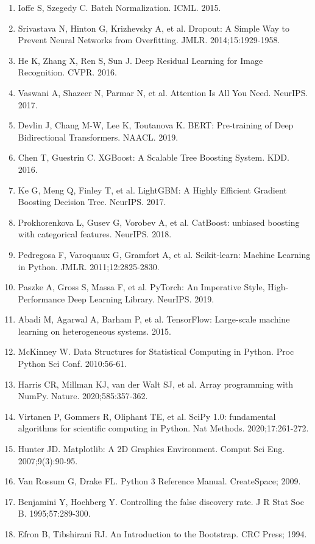 \documentclass[11pt]{article}
\begin{document}
\begin{enumerate}
\item Ioffe S, Szegedy C. Batch Normalization. ICML. 2015.
\item Srivastava N, Hinton G, Krizhevsky A, et al. Dropout: A Simple Way to Prevent Neural Networks from Overfitting. JMLR. 2014;15:1929-1958.
\item He K, Zhang X, Ren S, Sun J. Deep Residual Learning for Image Recognition. CVPR. 2016.
\item Vaswani A, Shazeer N, Parmar N, et al. Attention Is All You Need. NeurIPS. 2017.
\item Devlin J, Chang M-W, Lee K, Toutanova K. BERT: Pre-training of Deep Bidirectional Transformers. NAACL. 2019.
\item Chen T, Guestrin C. XGBoost: A Scalable Tree Boosting System. KDD. 2016.
\item Ke G, Meng Q, Finley T, et al. LightGBM: A Highly Efficient Gradient Boosting Decision Tree. NeurIPS. 2017.
\item Prokhorenkova L, Gusev G, Vorobev A, et al. CatBoost: unbiased boosting with categorical features. NeurIPS. 2018.
\item Pedregosa F, Varoquaux G, Gramfort A, et al. Scikit-learn: Machine Learning in Python. JMLR. 2011;12:2825-2830.
\item Paszke A, Gross S, Massa F, et al. PyTorch: An Imperative Style, High-Performance Deep Learning Library. NeurIPS. 2019.
\item Abadi M, Agarwal A, Barham P, et al. TensorFlow: Large-scale machine learning on heterogeneous systems. 2015.
\item McKinney W. Data Structures for Statistical Computing in Python. Proc Python Sci Conf. 2010:56-61.
\item Harris CR, Millman KJ, van der Walt SJ, et al. Array programming with NumPy. Nature. 2020;585:357-362.
\item Virtanen P, Gommers R, Oliphant TE, et al. SciPy 1.0: fundamental algorithms for scientific computing in Python. Nat Methods. 2020;17:261-272.
\item Hunter JD. Matplotlib: A 2D Graphics Environment. Comput Sci Eng. 2007;9(3):90-95.
\item Van Rossum G, Drake FL. Python 3 Reference Manual. CreateSpace; 2009.
\item Benjamini Y, Hochberg Y. Controlling the false discovery rate. J R Stat Soc B. 1995;57:289-300.
\item Efron B, Tibshirani RJ. An Introduction to the Bootstrap. CRC Press; 1994.

\end{enumerate}
\end{document}
